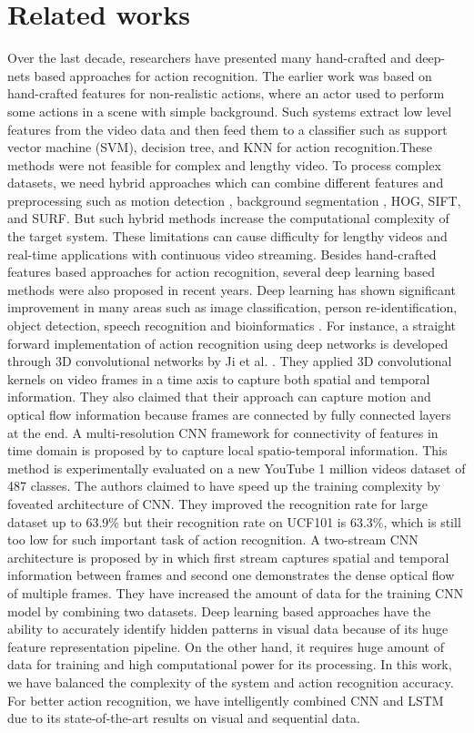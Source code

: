 \documentclass[a4paper,12pt]{article}
\begin{document}
\section{Related works}
Over the last decade, researchers have presented many hand-crafted and deep-nets based approaches for action recognition. The earlier work was based on hand-crafted features for non-realistic actions, where an actor used to perform some actions in a scene with simple background. Such systems extract low level features from the video data and then feed them to a classifier such as support vector machine (SVM), decision tree, and KNN for action recognition.These methods were not feasible for complex and lengthy video. To process complex datasets, we need hybrid approaches which can combine different features and preprocessing such as motion detection \cite{choudhury2016evaluation}, background segmentation \cite{choudhury2017segmenting}, HOG, SIFT, and SURF. But such hybrid methods increase the computational complexity of the target system. These limitations can cause difficulty for lengthy videos and real-time applications with continuous video streaming. Besides hand-crafted features based approaches for action recognition, several deep learning based methods were also proposed in recent years. Deep learning has shown significant improvement in many areas such as image classification, person re-identification, object detection, speech recognition and bioinformatics \cite{choudhury2018improved}. For instance, a straight forward implementation of action recognition using deep networks is developed through 3D convolutional networks by Ji et al. \cite{ji20123d}. They applied 3D convolutional kernels on video frames in a time axis to capture both spatial and temporal information. They also claimed that their approach can capture motion and optical flow information because frames are connected by fully connected layers at the end. A multi-resolution CNN framework for connectivity of features in time domain is proposed by \cite{karpathy2014large} to capture local spatio-temporal information. This method is experimentally evaluated on a new YouTube 1 million videos dataset of 487 classes. The authors claimed to have speed up the training complexity by foveated architecture of CNN. They improved the recognition rate for large dataset up to 63.9\% but their recognition rate on UCF101 is 63.3\%, which is still too low for such important task of action recognition. A two-stream CNN architecture is proposed by \cite{simonyan2014two} in which first stream captures spatial and temporal information between frames and second one demonstrates the dense optical flow of multiple frames. They have increased the amount of data for the training CNN model by combining two datasets. Deep learning based approaches have the ability to accurately identify hidden patterns in visual data because of its huge feature representation pipeline. On the other hand, it requires huge amount of data for training and high computational power for its processing. In this work, we have balanced the complexity of the system and action recognition accuracy. For better action recognition, we have intelligently combined CNN and LSTM due to its state-of-the-art results on visual and sequential data.
\end{document}

